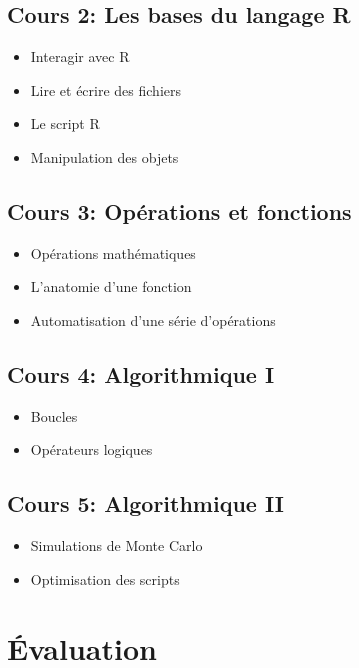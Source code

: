 \documentclass[12]{article}
\begin{document}
	\subsection*{Cours 2: Les bases du langage R}
	\renewcommand{\labelitemi}{$\bullet$}	
	\begin{itemize}
		\item Interagir avec R
		\item Lire et écrire des fichiers
		\item Le script R
		\item Manipulation des objets
	\end{itemize}

	\subsection*{Cours 3: Opérations et fonctions}
	\renewcommand{\labelitemi}{$\bullet$}	
	\begin{itemize}
		\item Opérations mathématiques
		\item L'anatomie d'une fonction
		\item Automatisation d'une série d'opérations		
	\end{itemize}

	\subsection*{Cours 4: Algorithmique I}
	\renewcommand{\labelitemi}{$\bullet$}	
	\begin{itemize}
		\item Boucles
		\item Opérateurs logiques
	\end{itemize}

	\subsection*{Cours 5: Algorithmique II}
	\renewcommand{\labelitemi}{$\bullet$}	
	\begin{itemize}
		\item Simulations de Monte Carlo
		\item Optimisation des scripts
	\end{itemize}

	\section*{Évaluation}
\end{document}
